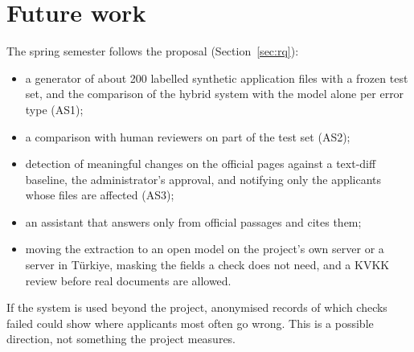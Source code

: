 \section{Future work}
The spring semester follows the proposal (Section~\ref{sec:rq}):
\begin{itemize}
  \item a generator of about 200 labelled synthetic application files with a frozen test set, and
    the comparison of the hybrid system with the model alone per error type (AS1);
  \item a comparison with human reviewers on part of the test set (AS2);
  \item detection of meaningful changes on the official pages against a text-diff baseline, the
    administrator's approval, and notifying only the applicants whose files are affected (AS3);
  \item an assistant that answers only from official passages and cites them;
  \item moving the extraction to an open model on the project's own server or a server in Türkiye,
    masking the fields a check does not need, and a KVKK review before real documents are allowed.
\end{itemize}
If the system is used beyond the project, anonymised records of which checks failed could show
where applicants most often go wrong. This is a possible direction, not something the project
measures.
